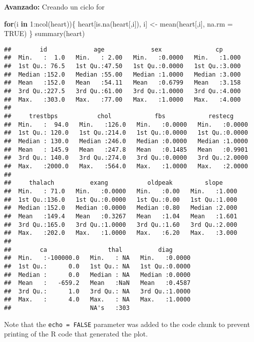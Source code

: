 \documentclass[
]{article}
\newenvironment{Shaded}{\begin{snugshade}}{\end{snugshade}}
\newcommand{\AttributeTok}[1]{\textcolor[rgb]{0.77,0.63,0.00}{#1}}
\newcommand{\ConstantTok}[1]{\textcolor[rgb]{0.00,0.00,0.00}{#1}}
\newcommand{\ControlFlowTok}[1]{\textcolor[rgb]{0.13,0.29,0.53}{\textbf{#1}}}
\newcommand{\DecValTok}[1]{\textcolor[rgb]{0.00,0.00,0.81}{#1}}
\newcommand{\FunctionTok}[1]{\textcolor[rgb]{0.00,0.00,0.00}{#1}}
\newcommand{\NormalTok}[1]{#1}
\newcommand{\OtherTok}[1]{\textcolor[rgb]{0.56,0.35,0.01}{#1}}
\newcommand{\SpecialCharTok}[1]{\textcolor[rgb]{0.00,0.00,0.00}{#1}}
\begin{document}
\textbf{Avanzado:} Creando un ciclo for

\begin{Shaded}
\begin{Highlighting}[]
\ControlFlowTok{for}\NormalTok{(i }\ControlFlowTok{in} \DecValTok{1}\SpecialCharTok{:}\FunctionTok{ncol}\NormalTok{(heart))\{}
\NormalTok{  heart[}\FunctionTok{is.na}\NormalTok{(heart[,i]), i] }\OtherTok{\textless{}{-}} \FunctionTok{mean}\NormalTok{(heart[,i], }\AttributeTok{na.rm =} \ConstantTok{TRUE}\NormalTok{)}
\NormalTok{    \}}
\FunctionTok{summary}\NormalTok{(heart)}
\end{Highlighting}
\end{Shaded}

\begin{verbatim}
##        id             age             sex               cp       
##  Min.   :  1.0   Min.   : 2.00   Min.   :0.0000   Min.   :1.000  
##  1st Qu.: 76.5   1st Qu.:47.50   1st Qu.:0.0000   1st Qu.:3.000  
##  Median :152.0   Median :55.00   Median :1.0000   Median :3.000  
##  Mean   :152.0   Mean   :54.11   Mean   :0.6799   Mean   :3.158  
##  3rd Qu.:227.5   3rd Qu.:61.00   3rd Qu.:1.0000   3rd Qu.:4.000  
##  Max.   :303.0   Max.   :77.00   Max.   :1.0000   Max.   :4.000  
##                                                                  
##     trestbps           chol            fbs            restecg      
##  Min.   :  94.0   Min.   :126.0   Min.   :0.0000   Min.   :0.0000  
##  1st Qu.: 120.0   1st Qu.:214.0   1st Qu.:0.0000   1st Qu.:0.0000  
##  Median : 130.0   Median :246.0   Median :0.0000   Median :1.0000  
##  Mean   : 145.9   Mean   :247.8   Mean   :0.1485   Mean   :0.9901  
##  3rd Qu.: 140.0   3rd Qu.:274.0   3rd Qu.:0.0000   3rd Qu.:2.0000  
##  Max.   :2000.0   Max.   :564.0   Max.   :1.0000   Max.   :2.0000  
##                                                                    
##     thalach          exang           oldpeak         slope      
##  Min.   : 71.0   Min.   :0.0000   Min.   :0.00   Min.   :1.000  
##  1st Qu.:136.0   1st Qu.:0.0000   1st Qu.:0.00   1st Qu.:1.000  
##  Median :152.0   Median :0.0000   Median :0.80   Median :2.000  
##  Mean   :149.4   Mean   :0.3267   Mean   :1.04   Mean   :1.601  
##  3rd Qu.:165.0   3rd Qu.:1.0000   3rd Qu.:1.60   3rd Qu.:2.000  
##  Max.   :202.0   Max.   :1.0000   Max.   :6.20   Max.   :3.000  
##                                                                 
##        ca                 thal          diag       
##  Min.   :-100000.0   Min.   : NA   Min.   :0.0000  
##  1st Qu.:      0.0   1st Qu.: NA   1st Qu.:0.0000  
##  Median :      0.0   Median : NA   Median :0.0000  
##  Mean   :   -659.2   Mean   :NaN   Mean   :0.4587  
##  3rd Qu.:      1.0   3rd Qu.: NA   3rd Qu.:1.0000  
##  Max.   :      4.0   Max.   : NA   Max.   :1.0000  
##                      NA's   :303
\end{verbatim}

Note that the \texttt{echo\ =\ FALSE} parameter was added to the code
chunk to prevent printing of the R code that generated the plot.
\end{document}

